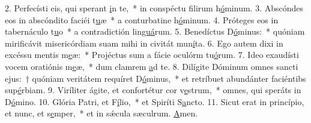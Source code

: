 2. Perfecísti eis, qui sperant \uline{i}n te,~* in conspéctu filirum h\uline{ó}minum.
3. Abscóndes eos in abscóndito faciéi t\uline{u}æ~* a conturbatine h\uline{ó}minum.
4. Próteges eos in tabernáculo t\uline{u}o~* a contradictión lin\uline{guá}rum.
5. Benedíctus D\uline{ó}minus:~* quóniam mirificávit misericórdiam suam mihi in civitát mun\uline{í}ta.
6. Ego autem dixi in excéssu mentis m\uline{e}æ:~* Projéctus sum a fácie oculórm tu\uline{ó}rum.
7. Ideo exaudísti vocem oratiónis m\uline{e}æ,~* dum clamrem \uline{a}d te.
8. Dilígite Dóminum omnes sancti ejus:~† quóniam veritátem requíret D\uline{ó}minus,~* et retríbuet abundánter faciéntibs sup\uline{é}rbiam.
9. Viríliter ágite, et confortétur cor v\uline{e}strum,~* omnes, qui speráts in D\uline{ó}mino.
10. Glória Patri, et F\uline{í}lio,~* et Spiríti S\uline{a}ncto.
11. Sicut erat in princípio, et nunc, et s\uline{e}mper,~* et in sǽcula sæculrum. \uline{A}men.
